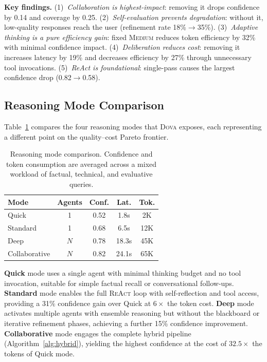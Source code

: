 \documentclass{article}
\theoremstyle{plain}
\theoremstyle{definition}
\newcommand{\dova}{\textsc{Dova}}
\newcommand{\react}{\textsc{ReAct}}
\begin{document}
\textbf{Key findings.}\quad
(1)~\emph{Collaboration is highest-impact}: removing it drops confidence by
0.14 and coverage by 0.25.
(2)~\emph{Self-evaluation prevents degradation}: without it, low-quality
responses reach the user (refinement rate 18\%$\to$35\%).
(3)~\emph{Adaptive thinking is a pure efficiency gain}: fixed \textsc{Medium}
reduces token efficiency by 32\% with minimal confidence impact.
(4)~\emph{Deliberation reduces cost}: removing it increases latency by 19\%
and decreases efficiency by 27\% through unnecessary tool invocations.
(5)~\emph{ReAct is foundational}: single-pass causes the largest confidence
drop (0.82$\to$0.58).

\subsection{Reasoning Mode Comparison}

Table~\ref{tab:modes} compares the four reasoning modes that \dova{} exposes,
each representing a different point on the quality--cost Pareto frontier.

\begin{table}[t]
\caption{Reasoning mode comparison.  Confidence and token consumption are
averaged across a mixed workload of factual, technical, and evaluative queries.}
\label{tab:modes}
\centering
\small
\begin{tabular}{@{}lcccc@{}}
\toprule
\textbf{Mode} & \textbf{Agents} & \textbf{Conf.} & \textbf{Lat.} & \textbf{Tok.} \\
\midrule
Quick          & 1   & 0.52 & 1.8s  & 2K   \\
Standard       & 1   & 0.68 & 6.5s  & 12K  \\
Deep           & $N$ & 0.78 & 18.3s & 45K  \\
Collaborative  & $N$ & 0.82 & 24.1s & 65K  \\
\bottomrule
\end{tabular}
\end{table}

\textbf{Quick} mode uses a single agent with minimal thinking budget and no
tool invocation, suitable for simple factual recall or conversational
follow-ups.  \textbf{Standard} mode enables the full \react{} loop with
self-reflection and tool access, providing a 31\% confidence gain over Quick at
$6\times$ the token cost.  \textbf{Deep} mode activates multiple agents with
ensemble reasoning but without the blackboard or iterative refinement phases,
achieving a further 15\% confidence improvement.  \textbf{Collaborative} mode
engages the complete hybrid pipeline (Algorithm~\ref{alg:hybrid}), yielding
the highest confidence at the cost of $32.5\times$ the tokens of Quick mode.
\end{document}
